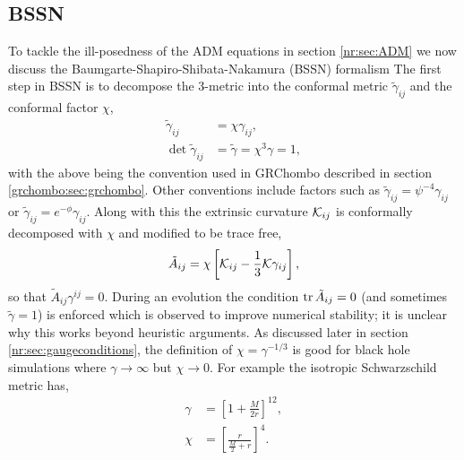 \subsection{BSSN} \label{nr:sec:bssn}
To tackle the ill-posedness of the ADM equations in section \ref{nr:sec:ADM} we now discuss the Baumgarte-Shapiro-Shibata-Nakamura (BSSN) formalism \cite{Baumgarte:1998te} The first step in BSSN is to decompose the 3-metric into the conformal metric $\tilde{\gamma}_{ij}$ and the conformal factor $\chi$,
\begin{align}
\tilde{\gamma}_{ij} &= \chi \gamma_{ij},\\
 \det{\tilde{\gamma}_{ij}} &= \tilde{\gamma} = \chi^3\gamma = 1,
\end{align}
with the above being the convention used in {\sc GRChombo} described in section \ref{grchombo:sec:grchombo}. Other conventions include factors such as
$\tilde{\gamma}_{ij} = \psi^{-4}\gamma_{ij}$ or $\tilde{\gamma}_{ij} =e^{-\phi}\gamma_{ij}$.
Along with this the extrinsic curvature $\mathcal{K}_{ij}$ is conformally decomposed with $\chi$ and modified to be trace free,
\begin{equation} \tilde{A}_{ij} = \chi\left[ \mathcal{K}_{ij}-\frac{1}{3}\mathcal{K}\gamma_{ij}\right], \end{equation} so that $\tilde{A}_{ij}\gamma^{ij}=0$.
During an evolution the condition $\trace{\tilde{A}_{ij}=0}$ (and sometimes $\tilde{\gamma}=1$) is enforced which is observed to improve numerical stability; it is unclear why this works beyond heuristic arguments. As discussed later in section \ref{nr:sec:gaugeconditions}, the definition of $\chi = \gamma^{-1/3}$ is good for black hole simulations where $\gamma\rightarrow\infty$ but $\chi \rightarrow 0$. For example the isotropic Schwarzschild metric has,
\begin{align}
\gamma &= \left[ 1+ \frac{M}{2r}\right]^{12},\\
\chi &=\left[ \frac{r}{\frac{M}{2} + r}\right]^4.
\end{align}

